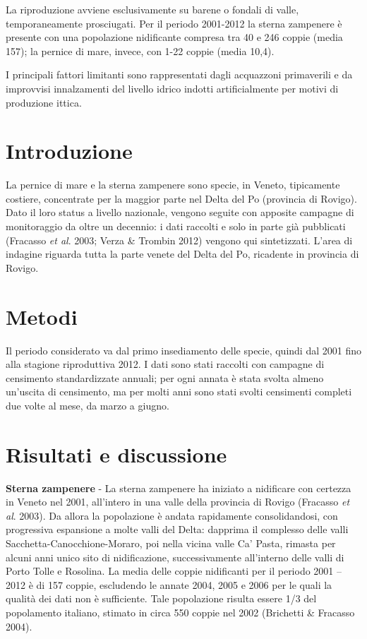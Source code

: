 La riproduzione avviene esclusivamente su barene o fondali di valle,
temporaneamente prosciugati. Per il periodo 2001-2012 la sterna
zampenere \`e presente con una popolazione nidificante compresa tra 40
e 246 coppie (media 157); la pernice di mare, invece, con 1-22 coppie
(media 10,4).

I principali fattori limitanti sono rappresentati dagli acquazzoni
primaverili e da improvvisi innalzamenti del livello idrico indotti
artificialmente per motivi di produzione ittica.





\section*{Introduzione}

La pernice di mare e la sterna zampenere sono specie, in Veneto,
tipicamente costiere, concentrate per la maggior parte nel Delta del Po
(provincia di Rovigo). Dato il loro status a livello nazionale, vengono
seguite con apposite campagne di monitoraggio da oltre un decennio: i
dati raccolti e solo in parte gi\`a pubblicati (Fracasso \textit{et
al}. 2003; Verza \& Trombin 2012) vengono qui sintetizzati. 
L{\textquoteright}area di indagine riguarda tutta la parte venete del
Delta del Po, ricadente in provincia di Rovigo.

\section*{Metodi}

Il periodo considerato va dal primo insediamento delle specie, quindi
dal 2001 fino alla stagione riproduttiva 2012. I dati sono stati
raccolti con campagne di censimento standardizzate annuali; per ogni
annata \`e stata svolta almeno un{\textquoteright}uscita di censimento,
ma per molti anni sono stati svolti censimenti completi due volte al
mese, da marzo a giugno.

\section*{Risultati e discussione}

\textbf{Sterna zampenere} - La sterna zampenere ha iniziato a nidificare con certezza in Veneto nel
2001, all{\textquoteright}intero in una valle della provincia di Rovigo
(Fracasso \textit{et al}. 2003). Da allora la popolazione \`e andata
rapidamente consolidandosi, con progressiva espansione a molte valli
del Delta: dapprima il complesso delle valli
Sacchetta-Canocchione-Moraro, poi nella vicina valle
Ca{\textquoteright} Pasta, rimasta per alcuni anni unico sito di
nidificazione, successivamente all{\textquoteright}interno delle valli
di Porto Tolle e Rosolina. La media delle coppie nidificanti per il
periodo 2001 -- 2012 \`e di 157 coppie, escludendo le annate 2004, 2005
e 2006 per le quali la qualit\`a dei dati non \`e sufficiente. Tale
popolazione risulta essere 1/3 del popolamento italiano, stimato in
circa 550 coppie nel 2002 (Brichetti  \& Fracasso 2004).

